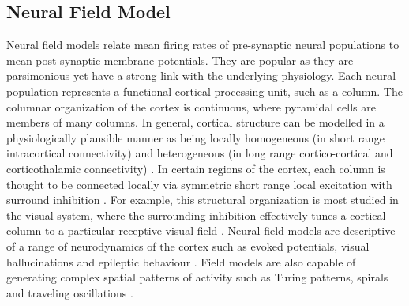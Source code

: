 \documentclass[review,authoryear,3p]{elsarticle}
\begin{document}
\subsection{Neural Field Model}\label{NeuralModelSection} 
Neural field models relate mean firing rates of pre-synaptic neural populations to mean post-synaptic membrane potentials. They are popular as they are parsimonious yet have a strong link with the underlying physiology. Each neural population represents a functional cortical processing unit, such as a column. The columnar organization of the cortex is continuous, where pyramidal cells are members of many columns. In general, cortical structure can be modelled in a physiologically plausible manner as being locally homogeneous (in short range intracortical connectivity) and heterogeneous (in long range cortico-cortical and corticothalamic connectivity) \citep{Jirsa2009,Qubbaj2007}. In certain regions of the cortex, each column is thought to be connected locally via symmetric short range local excitation with surround inhibition \citep{Braitenberg1998}. For example, this structural organization is most studied in the visual system, where the surrounding inhibition effectively tunes a cortical column to a particular receptive visual field \citep{Sullivan2006}. Neural field models are descriptive of a range of neurodynamics of the cortex such as evoked potentials, visual hallucinations and epileptic behaviour \citep{David2003,Bressloff2001,Breakspear2006}. Field models are also capable of generating complex spatial patterns of activity such as Turing patterns, spirals and traveling oscillations \citep{Amari1977,Coombes2005,Coombes2007}.
\end{document}
